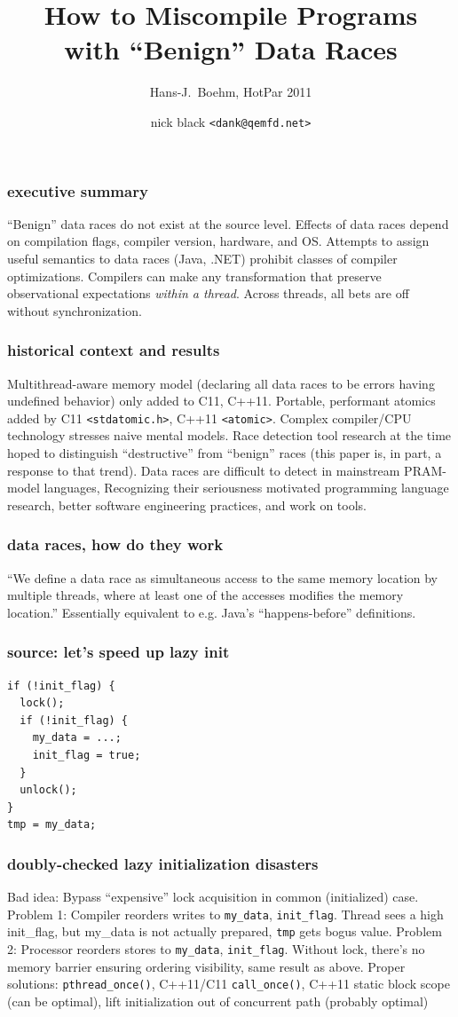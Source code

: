 \documentclass{beamer}
\title{How to Miscompile Programs\\ with ``Benign'' Data Races}
\subtitle{Hans-J.\ Boehm, HotPar 2011}
\author{nick black {\texttt{<dank@qemfd.net>}}}
\institute{Atlanta PWL \#09, 2018-10-09}
\date{}
\begin{document}
\begin{frame}
\titlepage
\end{frame}

\begin{frame}
\frametitle{executive summary}
``Benign'' data races do not exist at the source level.
\vfill
Effects of data races depend on compilation flags, compiler version, hardware,
and OS.
\vfill
Attempts to assign useful semantics to data races (Java, .NET) prohibit
classes of compiler optimizations.
\vfill
Compilers can make any transformation that preserve observational
expectations \textit{within a thread}. Across threads, all bets are off without
synchronization.
\end{frame}

\begin{frame}
\frametitle{historical context and results}
Multithread-aware memory model (declaring all data races to be errors having undefined behavior) only added to C11, C++11.
\vfill
Portable, performant atomics added by C11 \texttt{<stdatomic.h>}, C++11 \texttt{<atomic>}.
\vfill
Complex compiler/CPU technology stresses naive mental models.
\vfill
Race detection tool research at the time hoped to distinguish ``destructive'' from ``benign'' races (this paper is, in part, a response to that trend).
\vfill
Data races are difficult to detect in mainstream PRAM-model languages, Recognizing their seriousness motivated programming language research, better software engineering practices, and work on tools.
\end{frame}

\begin{frame}
\frametitle{data races, how do they work}
``We define a data race as simultaneous access to the same
memory location by multiple threads, where at least one
of the accesses modifies the memory location.''
\vfill
Essentially equivalent to e.g. Java's ``happens-before'' definitions.
\end{frame}

\begin{frame}[fragile]
\frametitle{source: let's speed up lazy init}
\begin{lstlisting}
if (!init_flag) {
  lock();
  if (!init_flag) {
    my_data = ...;
    init_flag = true;
  }
  unlock();
}
tmp = my_data;
\end{lstlisting}
\end{frame}

\begin{frame}
\frametitle{doubly-checked lazy initialization disasters}
Bad idea: Bypass ``expensive'' lock acquisition in common (initialized) case.
\vfill
Problem 1: Compiler reorders writes to \texttt{my\_data}, \texttt{init\_flag}. Thread sees a high init\_flag, but my\_data is not actually prepared, \texttt{tmp} gets bogus value.
\vfill
Problem 2: Processor reorders stores to \texttt{my\_data}, \texttt{init\_flag}. Without lock, there's no memory barrier ensuring ordering visibility, same result as above.
\vfill
Proper solutions: {\texttt{pthread\_once()}}, C++11/C11 \texttt{call\_once()}, C++11 static block scope (can be optimal), lift initialization out of concurrent path (probably optimal)
\end{frame}
\end{document}

